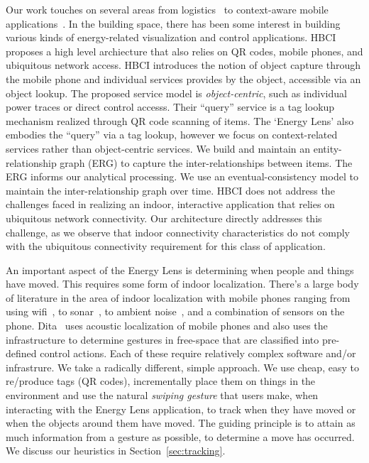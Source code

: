 Our work touches on several areas from logistics~\cite{rfid_gonz2006} 
to context-aware 
mobile applications~\cite{ACE}.  
In the building space, there has been
some interest in building various kinds of energy-related visualization and control applications.
HBCI~\cite{hbci} proposes a high level archiecture that also relies on QR codes, mobile phones, and ubiquitous network access.  HBCI introduces 
the notion of object capture through 
the mobile phone and  individual services provides by the object, accessible via an object lookup.  The proposed service model is 
\emph{object-centric}, such as individual power traces or direct control accesss.  Their ``query'' service is a tag lookup mechanism realized through
 QR code scanning of items.  The `Energy Lens' also embodies the ``query'' via a tag lookup, however 
we focus on context-related services rather than object-centric services.  We build and maintain an entity-relationship graph (ERG) to
capture the inter-relationships between items.  The ERG informs our analytical processing.  We use an eventual-consistency model to 
maintain the inter-relationship graph over time.  HBCI does not address the challenges faced in realizing an indoor, interactive application 
that relies on ubiquitous network connectivity.  Our architecture directly addresses this challenge, as we observe that indoor connectivity characteristics do 
not comply with the ubiquitous connectivity requirement for this class of application.


An important aspect of the Energy Lens is determining when people and things have moved.  This requires some form 
of indoor localization.  There's a large body of literature in the area of indoor localization with mobile phones ranging from 
using wifi~\cite{radar}, to sonar~\cite{cricket}, to ambient noise~\cite{abs}, and a combination of sensors on the 
phone\cite{surroundsense}.  Dita~\cite{dita} uses acoustic localization of mobile phones and also uses the infrastructure 
to determine gestures in free-space that are classified into pre-defined control actions.  Each of these require relatively complex 
software and/or infrastrure.  
We take a radically different, simple approach.  We use cheap, easy to re/produce tags (QR codes), incrementally place them on things in the 
environment and use the natural \emph{swiping gesture} that users make, when interacting with the Energy Lens 
application, to track when they have moved or when the objects around them have moved.  The guiding principle is to attain as much 
information from a gesture as possible, to determine a move has occurred.  We discuss our heuristics in Section~\ref{sec:tracking}.

